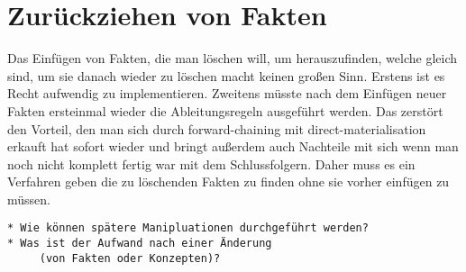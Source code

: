 

\section{Zurückziehen von Fakten}
Das Einfügen von Fakten, die man löschen will, um herauszufinden, welche gleich sind, um sie danach wieder zu löschen macht keinen großen Sinn. Erstens ist es Recht aufwendig zu implementieren. Zweitens müsste nach dem Einfügen neuer Fakten ersteinmal wieder die Ableitungsregeln ausgeführt werden. Das zerstört den Vorteil, den man sich durch forward-chaining mit direct-materialisation erkauft hat sofort wieder und bringt außerdem auch Nachteile mit sich wenn man noch nicht komplett fertig war mit dem Schlussfolgern.
Daher muss es ein Verfahren geben die zu löschenden Fakten zu finden ohne sie vorher einfügen zu müssen.
\begin{verbatim} 
* Wie können spätere Manipluationen durchgeführt werden?
* Was ist der Aufwand nach einer Änderung
     (von Fakten oder Konzepten)?
\end{verbatim}
